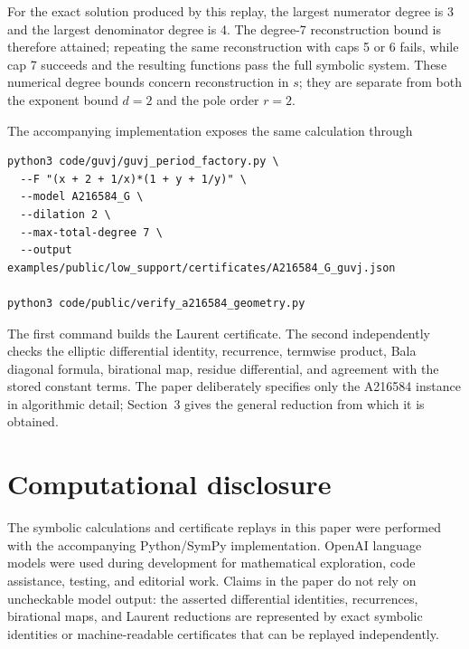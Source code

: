 \documentclass[11pt,fleqn]{article}
\theoremstyle{plain}
\begin{document}
For the exact solution produced by this replay, the largest numerator degree is
3 and the largest denominator degree is 4.  The degree-7 reconstruction bound
is therefore attained; repeating the same reconstruction with caps 5 or 6
fails, while cap 7 succeeds and the resulting functions pass the full symbolic
system.  These numerical degree bounds concern reconstruction in \(s\); they
are separate from both the exponent bound \(d=2\) and the pole order \(r=2\).

The accompanying implementation exposes the same calculation through
\begin{verbatim}
python3 code/guvj/guvj_period_factory.py \
  --F "(x + 2 + 1/x)*(1 + y + 1/y)" \
  --model A216584_G \
  --dilation 2 \
  --max-total-degree 7 \
  --output examples/public/low_support/certificates/A216584_G_guvj.json

python3 code/public/verify_a216584_geometry.py
\end{verbatim}
The first command builds the Laurent certificate.  The second independently
checks the elliptic differential identity, recurrence, termwise product, Bala
diagonal formula, birational map, residue differential, and agreement with the
stored constant terms.  The paper deliberately specifies only the A216584
instance in algorithmic detail; Section~3 gives the general reduction from
which it is obtained.

\section*{Computational disclosure}
The symbolic calculations and certificate replays in this paper were performed
with the accompanying Python/SymPy implementation.  OpenAI language models
were used during development for mathematical exploration, code assistance,
testing, and editorial work.  Claims in the paper do not rely on uncheckable
model output: the asserted differential identities, recurrences, birational
maps, and Laurent reductions are represented by exact symbolic identities or
machine-readable certificates that can be replayed independently.
\end{document}

